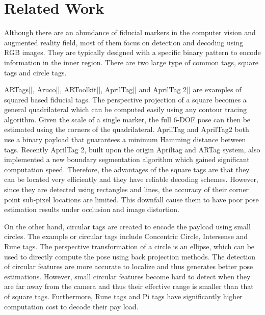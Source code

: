 \section{Related Work}
\label{sec:related}
	Although there are an abundance of fiducial markers in the computer vision and augmented reality field, most of them focus on detection and decoding using RGB images. They are typically designed with a specific binary pattern to encode information in the inner region. There are two large type of common tags, square tags and circle tags. 
	
	ARTags[], Aruco[], ARToolkit[], AprilTag[] and AprilTag 2[] are examples of squared based fiducial tags. The perspective projection of a square becomes a general quadrilateral which can be computed easily using any contour tracing algorithm. Given the scale of a single marker, the full 6-DOF pose can then be estimated using the corners of the quadrilateral. AprilTag and AprilTag2 both use a binary payload that guarantees a minimum Hamming distance between tags.  Recently AprilTag 2, built upon the origin Apriltag and ARTag system, also implemented a new boundary segmentation algorithm which gained significant computation speed. Therefore, the advantages of the square tags are that they can be located very efficiently and they have reliable decoding schemes. However, since they are detected using rectangles and lines, the accuracy of their corner point sub-pixel locations are limited. This downfall cause them to have poor pose estimation results under occlusion and image distortion.
	
	On the other hand, circular tags are created to encode the payload using small circles. The example or circular tags include Concentric Circle, Intersense and Rune tags. The perspective transformation of a circle is an ellipse, which can be used to directly compute the pose using back projection methods. The detection of circular features are more accurate to localize and thus generates better pose estimations. However, small circular features become hard to detect when they are far away from the camera and thus their effective range is smaller than that of square tags. Furthermore, Rune tags and Pi tags have significantly higher computation cost to decode their pay load. 